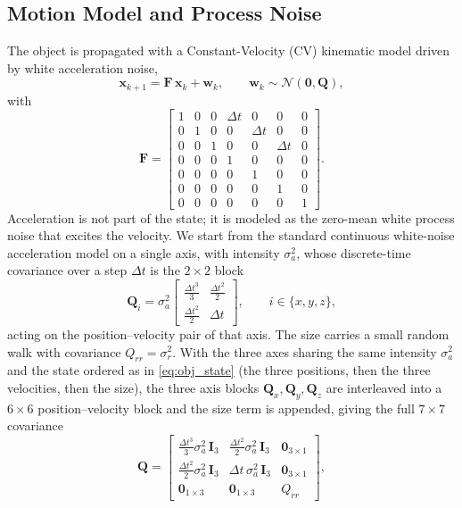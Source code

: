 \subsection{Motion Model and Process Noise}

The object is propagated with a Constant-Velocity (CV) kinematic model driven by
white acceleration noise,
\begin{equation}
  \bm{x}_{k+1} = \bm{F}\,\bm{x}_k + \bm{w}_k, \qquad \bm{w}_k \sim \mathcal{N}(\bm{0},\bm{Q}),
  \label{eq:process}
\end{equation}
with
\begin{equation}
  \bm{F} =
  \begin{bmatrix}
    1 & 0 & 0 & \Delta t & 0 & 0 & 0\\
    0 & 1 & 0 & 0 & \Delta t & 0 & 0\\
    0 & 0 & 1 & 0 & 0 & \Delta t & 0\\
    0 & 0 & 0 & 1 & 0 & 0 & 0\\
    0 & 0 & 0 & 0 & 1 & 0 & 0\\
    0 & 0 & 0 & 0 & 0 & 1 & 0\\
    0 & 0 & 0 & 0 & 0 & 0 & 1
  \end{bmatrix}.
  \label{eq:Fmatrix}
\end{equation}
Acceleration is not part of the state; it is modeled as the zero-mean white
process noise that excites the velocity. We start from the standard
continuous white-noise acceleration model on a single axis, with intensity
$\sigma_a^2$, whose discrete-time covariance over a step $\Delta t$ is the
$2\times2$ block
\begin{equation}
  \bm{Q}_i = \sigma_a^{2}
  \begin{bmatrix}
    \tfrac{\Delta t^{3}}{3} & \tfrac{\Delta t^{2}}{2}\\[4pt]
    \tfrac{\Delta t^{2}}{2} & \Delta t
  \end{bmatrix},
  \qquad i\in\{x,y,z\},
  \label{eq:Qaxis}
\end{equation}
acting on the position--velocity pair of that axis. The size carries a small
random walk with covariance $Q_{rr}=\sigma_r^{2}$. With the three axes sharing
the same intensity $\sigma_a^2$ and the state ordered as in \eqref{eq:obj_state}
(the three positions, then the three velocities, then the size), the three
axis blocks $\bm{Q}_x,\bm{Q}_y,\bm{Q}_z$ are interleaved into a $6\times6$
position--velocity block and the size term is appended, giving the full
$7\times7$ covariance
\begin{equation}
  \bm{Q} =
  \begin{bmatrix}
    \tfrac{\Delta t^{3}}{3}\sigma_a^{2}\,\bm{I}_3 & \tfrac{\Delta t^{2}}{2}\sigma_a^{2}\,\bm{I}_3 & \bm{0}_{3\times1}\\[4pt]
    \tfrac{\Delta t^{2}}{2}\sigma_a^{2}\,\bm{I}_3 & \Delta t\,\sigma_a^{2}\,\bm{I}_3 & \bm{0}_{3\times1}\\[4pt]
    \bm{0}_{1\times3} & \bm{0}_{1\times3} & Q_{rr}
  \end{bmatrix},
  \label{eq:Qfull}
\end{equation}
